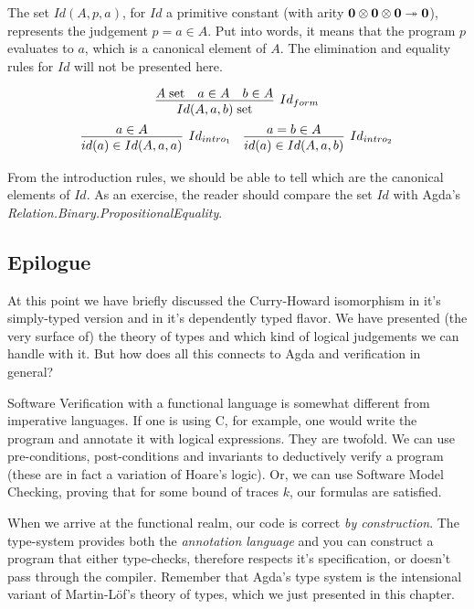 The set $Id(A, p, a)$, for $Id$ a primitive constant (with arity $\textbf{0} \otimes \textbf{0} \otimes \textbf{0} \twoheadrightarrow \textbf{0}$),
represents the judgement $p = a \in A$. Put into words, it means that the program $p$ evaluates to $a$,
which is a canonical element of $A$. The elimination and equality rules for $Id$ will not be presented here.

\[
  \infer[Id_{form}]
        {\isset{Id(A, a, b)}}
        { \isset{A}
        & a \in A
        & b \in A
        }
\]
\[
\begin{array}{c c}
  \infer[Id_{intro_1}]
        {id(a) \in Id(A, a, a)}
        {a \in A}
&
  \infer[Id_{intro_2}]
        {id(a) \in Id(A, a, b)}
        {a = b \in A}
\end{array}
\]

From the introduction rules, we should be able to tell which are the canonical elements of $Id$.
As an exercise, the reader should compare the set $Id$ with Agda's \emph{Relation.Binary.PropositionalEquality}.

\subsection{Epilogue}

At this point we have briefly discussed the Curry-Howard isomorphism in it's simply-typed
version and in it's dependently typed flavor. We have presented (the very surface of) the theory
of types and which kind of logical judgements we can handle with it. But how does all this connects 
to Agda and verification in general?

Software Verification with a functional language is somewhat different from imperative languages. 
If one is using C, for example, one would write the program and annotate it with logical expressions.
They are twofold. We can use pre-conditions, post-conditions and invariants to deductively verify a program
(these are in fact a variation of Hoare's logic). Or, we can use Software Model Checking, proving
that for some bound of traces $k$, our formulas are satisfied.

When we arrive at the functional realm, our code is correct \emph{by construction}. The type-system
provides both the \emph{annotation language} and you can construct a program that either type-checks,
therefore respects it's specification, or doesn't pass through the compiler. Remember that Agda's
type system is the intensional variant of Martin-L\"{o}f's theory of types, which we just presented
in this chapter.

